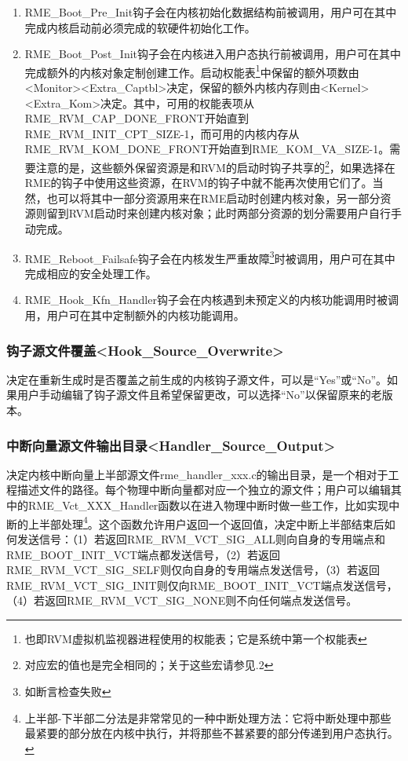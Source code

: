 \begin{enumerate}
\def\labelenumi{\arabic{enumi}.}
\item
  RME\_Boot\_Pre\_Init钩子会在内核初始化数据结构前被调用，用户可在其中完成内核启动前必须完成的软硬件初始化工作。
\item
  RME\_Boot\_Post\_Init钩子会在内核进入用户态执行前被调用，用户可在其中完成额外的内核对象定制创建工作。启动权能表\footnote{也即RVM虚拟机监视器进程使用的权能表；它是系统中第一个权能表}中保留的额外项数由<Monitor><Extra\_Captbl>决定，保留的额外内核内存则由<Kernel><Extra\_Kom>决定。其中，可用的权能表项从RME\_RVM\_CAP\_DONE\_FRONT开始直到RME\_RVM\_INIT\_CPT\_SIZE-1，而可用的内核内存从RME\_RVM\_KOM\_DONE\_FRONT开始直到RME\_KOM\_VA\_SIZE-1。需要注意的是，这些额外保留资源是和RVM的启动时钩子共享的\footnote{对应宏的值也是完全相同的；关于这些宏请参见.2}，如果选择在RME的钩子中使用这些资源，在RVM的钩子中就不能再次使用它们了。当然，也可以将其中一部分资源用来在RME启动时创建内核对象，另一部分资源则留到RVM启动时来创建内核对象；此时两部分资源的划分需要用户自行手动完成。
\item
  RME\_Reboot\_Failsafe钩子会在内核发生严重故障\footnote{如断言检查失败}时被调用，用户可在其中完成相应的安全处理工作。
\item
  RME\_Hook\_Kfn\_Handler钩子会在内核遇到未预定义的内核功能调用时被调用，用户可在其中定制额外的内核功能调用。
\end{enumerate}

\subsubsection{钩子源文件覆盖<Hook\_Source\_Overwrite>{}}\label{subsubsec:5-3-12-20}

决定在重新生成时是否覆盖之前生成的内核钩子源文件，可以是``Yes''或``No''。如果用户手动编辑了钩子源文件且希望保留更改，可以选择``No''以保留原来的老版本。

\subsubsection{中断向量源文件输出目录<Handler\_Source\_Output>{}}\label{subsubsec:5-3-12-21}

决定内核中断向量上半部源文件rme\_handler\_xxx.c的输出目录，是一个相对于工程描述文件的路径。每个物理中断向量都对应一个独立的源文件；用户可以编辑其中的RME\_Vct\_XXX\_Handler函数以在进入物理中断时做一些工作，比如实现中断的上半部处理\footnote{上半部-下半部二分法是非常常见的一种中断处理方法：它将中断处理中那些最紧要的部分放在内核中执行，并将那些不甚紧要的部分传递到用户态执行。}。这个函数允许用户返回一个返回值，决定中断上半部结束后如何发送信号：（1）若返回RME\_RVM\_VCT\_SIG\_ALL则向自身的专用端点和RME\_BOOT\_INIT\_VCT端点都发送信号，（2）若返回RME\_RVM\_VCT\_SIG\_SELF则仅向自身的专用端点发送信号，（3）若返回RME\_RVM\_VCT\_SIG\_INIT则仅向RME\_BOOT\_INIT\_VCT端点发送信号，（4）若返回RME\_RVM\_VCT\_SIG\_NONE则不向任何端点发送信号。

